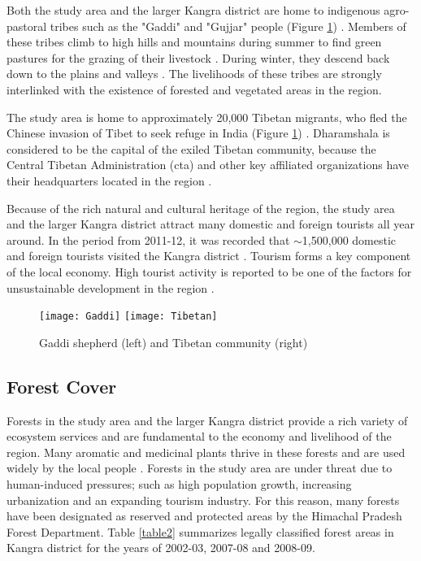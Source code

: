 \justify
Both the study area and the larger Kangra district are home to indigenous agro-pastoral tribes such as the "Gaddi" and "Gujjar" people (Figure \ref{Fig4}) . Members of these tribes climb to high hills and mountains during summer to find green pastures for the grazing of their livestock . During winter, they descend back down to the plains and valleys . The livelihoods of these tribes are strongly interlinked with the existence of forested and vegetated areas in the region. 

\justify
The study area is home to approximately 20,000 Tibetan migrants, who fled the Chinese invasion of Tibet to seek refuge in India (Figure \ref{Fig4}) \citep{Frilund2014}. Dharamshala is considered to be the capital of the exiled Tibetan community, because the Central Tibetan Administration (\ac{cta}) and other key affiliated organizations have their headquarters located in the region \citep{Frilund2014}. 

\justify
Because of the rich natural and cultural heritage of the region, the study area and the larger Kangra district attract many domestic and foreign tourists all year around. In the period from 2011-12, it was recorded that $\sim$1,500,000 domestic and foreign tourists visited the Kangra district . Tourism forms a key component of the local economy. High tourist activity is reported to be one of the factors for unsustainable development in the region .\vspace{5pt}

\begin{figure}[H]
	\centering
	\texttt{[image: Gaddi]}
	\texttt{[image: Tibetan]}
	\caption{Gaddi shepherd (left)  and Tibetan community (right) \citep{Singh2012, Frilund2014}}\label{Fig4}
\end{figure}
\vspace{-12pt}

\subsection{Forest Cover}

\justify
Forests in the study area and the larger Kangra district provide a rich variety of ecosystem services and are fundamental to the economy and livelihood of the region. Many aromatic and medicinal plants thrive in these forests and are used widely by the local people . Forests in the study area are under threat due to human-induced pressures; such as high population growth, increasing urbanization and an expanding tourism industry. For this reason, many forests have been designated as reserved and protected areas by the Himachal Pradesh Forest Department. Table \ref{table2} summarizes legally classified forest areas in Kangra district for the years of 2002-03, 2007-08 and 2008-09. 

